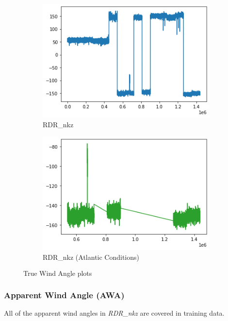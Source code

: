 \begin{figure}[h]
     \centering
     \begin{subfigure}[t]{0.49\textwidth}
         \centering
         \includegraphics[width=\textwidth]{figures/distributions/RDR-TWA.png}
         \caption{RDR\_nkz}
     \end{subfigure}
     \hfill
     \begin{subfigure}[t]{0.49\textwidth}
         \centering
         \includegraphics[width=\textwidth]{figures/distributions/RDR-atlantic-TWA.png}
         \caption{RDR\_nkz (Atlantic Conditions)}
     \end{subfigure}
        \caption{True Wind Angle plots}
\end{figure}

\clearpage
\subsubsection{Apparent Wind Angle (AWA)}
All of the apparent wind angles in \textit{RDR\_nkz} are covered in training data.

